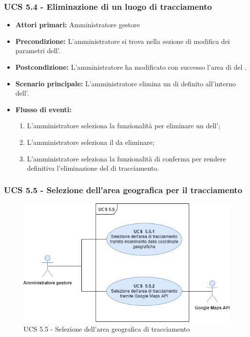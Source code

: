 \subsubsection{UCS 5.4 - Eliminazione di un luogo di tracciamento}%
\begin{itemize}
    \item \textbf{Attori primari:} Amministratore gestore
    \item \textbf{Precondizione:} L'amministratore si trova nella sezione di modifica dei parametri dell'.
    \item \textbf{Postcondizione:} L'amministratore ha modificato con successo l'area di  del .
    \item \textbf{Scenario principale:} L'amministratore elimina un  di  definito all'interno dell'.
    \item \textbf{Flusso di eventi:}
    \begin{enumerate}%
        \item L'amministratore seleziona la funzionalità per eliminare un  dell';
        \item L'amministratore seleziona il  da eliminare;
        \item L'amministratore seleziona la funzionalità di conferma per rendere definitiva l'eliminazione del  di tracciamento.
    \end{enumerate}
\end{itemize}

\subsubsection{UCS 5.5 - Selezione dell'area geografica per il tracciamento}%

\begin{figure}[h!]
	\centering
    \includegraphics[scale=0.53]{Sezioni/UseCase/Immagini/UCS5.5.png}
    \caption{UCS 5.5 - Selezione dell'area geografica di tracciamento}
\end{figure}

